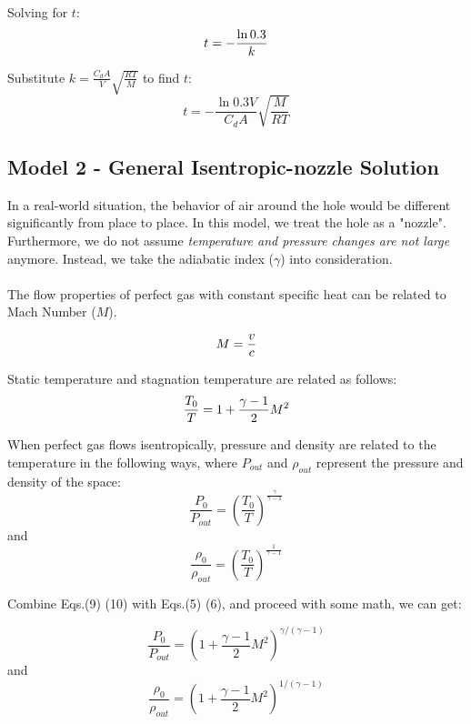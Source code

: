 Solving for $t$:
\begin{equation}\notag
    t = -\frac{\ln 0.3}{k}
\end{equation}

Substitute $k = \frac{C_d A}{V} \sqrt{\frac{RT}{M}}$ to find $t$:
\begin{equation}
    t = -\frac{\ln 0.3 V}{C_d A} \sqrt{\frac{M}{RT}}
\end{equation}


\subsection{Model 2 - General Isentropic-nozzle Solution}
In a real-world situation, the behavior of air around the hole would be different significantly from place to place. In this model, we treat the hole as a "nozzle". Furthermore, we do not assume \emph{temperature and pressure changes are not large} anymore. Instead, we take the adiabatic index ($\gamma$) into consideration.
\\\\
The flow properties of perfect gas with constant specific heat can be related to Mach Number ($M$). 

\begin{equation}\notag
    M=\frac{v}{c}
\end{equation}

Static temperature and stagnation temperature are related as follows:\cite{saad-1985}
\begin{equation}\notag
\frac{T_0}{T} =  1 + \frac{\gamma - 1}{2} M^2 
\end{equation}

When perfect gas flows isentropically, pressure and density are related to the temperature in the following ways, where $P_{out}$ and $\rho_{out}$ represent the pressure and density of the space:
\begin{equation}
    \frac{P_0}{P_{out}}=(\frac{T_0}{T})^\frac{\gamma}{\gamma-1}
\end{equation}
and
\begin{equation}
    \frac{\rho_0}{\rho_{out}}=(\frac{T_0}{T})^\frac{1}{\gamma-1}
\end{equation}

Combine Eqs.(9) (10) with Eqs.(5) (6), and proceed with some math,\cite{saad-1985} we can get:

\begin{equation}
\frac{P_0}{P_{out}} = \left( 1 + \frac{\gamma - 1}{2} M^2 \right)^{\gamma/(\gamma - 1)}
\end{equation}
and
\begin{equation}
\frac{\rho_0}{\rho_{out}} = \left( 1 + \frac{\gamma - 1}{2} M^2 \right)^{1/(\gamma - 1)}
\end{equation}

